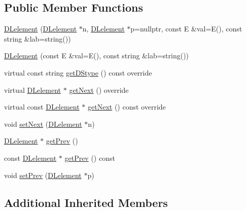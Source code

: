 \subsection*{Public Member Functions}
\begin{DoxyCompactItemize}
\item 
\mbox{\hyperlink{classbridges_1_1_d_lelement_a846424760c641ba5f496615361d8f79c}{D\+Lelement}} (\mbox{\hyperlink{classbridges_1_1_d_lelement}{D\+Lelement}} $\ast$n, \mbox{\hyperlink{classbridges_1_1_d_lelement}{D\+Lelement}} $\ast$p=nullptr, const E \&val=E(), const string \&lab=string())
\item 
\mbox{\hyperlink{classbridges_1_1_d_lelement_aab0e126bc0b34815f855899b5a8fa75a}{D\+Lelement}} (const E \&val=E(), const string \&lab=string())
\item 
virtual const string \mbox{\hyperlink{classbridges_1_1_d_lelement_a109be7aba8bd3d0450859938b5d3144c}{get\+D\+Stype}} () const override
\item 
virtual \mbox{\hyperlink{classbridges_1_1_d_lelement}{D\+Lelement}} $\ast$ \mbox{\hyperlink{classbridges_1_1_d_lelement_a0c713707d8c7d0a97fe4194ed6592ede}{get\+Next}} () override
\item 
virtual const \mbox{\hyperlink{classbridges_1_1_d_lelement}{D\+Lelement}} $\ast$ \mbox{\hyperlink{classbridges_1_1_d_lelement_a648012849263b4b1cd2d504d5e5fd880}{get\+Next}} () const override
\item 
void \mbox{\hyperlink{classbridges_1_1_d_lelement_aba19c60b1d10c145b1b737f9134f4497}{set\+Next}} (\mbox{\hyperlink{classbridges_1_1_d_lelement}{D\+Lelement}} $\ast$n)
\item 
\mbox{\hyperlink{classbridges_1_1_d_lelement}{D\+Lelement}} $\ast$ \mbox{\hyperlink{classbridges_1_1_d_lelement_a5b0316fb255d022b0dc3065d681fc2a7}{get\+Prev}} ()
\item 
const \mbox{\hyperlink{classbridges_1_1_d_lelement}{D\+Lelement}} $\ast$ \mbox{\hyperlink{classbridges_1_1_d_lelement_a6b46ea401b8192e9043f0493adcec63e}{get\+Prev}} () const
\item 
void \mbox{\hyperlink{classbridges_1_1_d_lelement_af146e0e10faba6395272d5fc1560f266}{set\+Prev}} (\mbox{\hyperlink{classbridges_1_1_d_lelement}{D\+Lelement}} $\ast$p)
\end{DoxyCompactItemize}
\subsection*{Additional Inherited Members}


